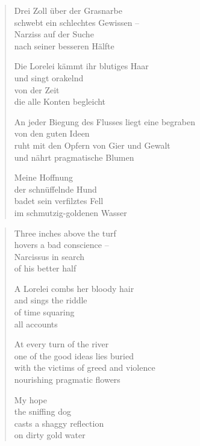 
\cleartoverso


\begin{verse}

Drei Zoll über der Grasnarbe\\
schwebt ein schlechtes Gewissen --\\
Narziss auf der Suche\\
nach seiner besseren Hälfte

Die Lorelei kämmt ihr blutiges Haar\\
und singt orakelnd\\
von der Zeit\\
die alle Konten begleicht

An jeder Biegung des Flusses liegt eine begraben\\
von den guten Ideen\\
ruht mit den Opfern von Gier und Gewalt\\
und nährt pragmatische Blumen

Meine Hoffnung\\
der schnüffelnde Hund\\
badet sein verfilztes Fell\\
im schmutzig-goldenen Wasser

\end{verse}

\clearpage


\begin{verse}

Three inches above the turf\\
hovers a bad conscience --\\
Narcissus in search\\
of his better half

A Lorelei combs her bloody hair\\
and sings the riddle\\
of time squaring\\
all accounts

At every turn of the river\\
one of the good ideas lies buried\\
with the victims of greed and violence\\
nourishing pragmatic flowers

My hope\\
the sniffing dog\\
casts a shaggy reflection\\
on dirty gold water

\end{verse}
